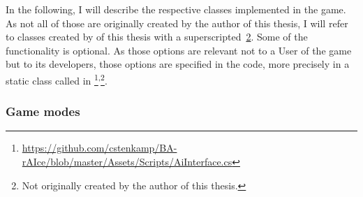 In the following, I will describe the respective classes implemented in the game. As not all of those are originally created by the author of this thesis, I will refer to classes created by \leon of this thesis with a superscripted~\ref{byLeon}. Some of the functionality is optional. As those options are relevant not to a User of the game but to its developers, those options are specified in the code, more precisely in a static class called  in \footnote{\label{aiint} \url{https://github.com/cstenkamp/BA-rAIce/blob/master/Assets/Scripts/AiInterface.cs}}\textsuperscript{,}\footnote{\label{byLeon} Not originally created by the author of this thesis.}.\\



\newcommand{\byLeon}{\textsuperscript{,\ref{byLeon}}{ }}

\subsubsection{Game modes}

